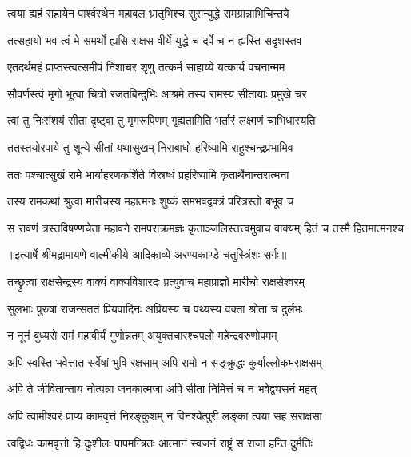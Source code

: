 \twolineshloka
{त्वया ह्यहं सहायेन पार्श्वस्थेन महाबल}
{भ्रातृभिश्च सुरान्युद्धे समग्रान्नाभिचिन्तये} %

\twolineshloka
{तत्सहायो भव त्वं मे समर्थो ह्यसि राक्षस}
{वीर्ये युद्धे च दर्पे च न ह्यस्ति सदृशस्तव} %

\twolineshloka
{एतदर्थमहं प्राप्तस्त्वत्समीपं निशाचर}
{शृणु तत्कर्म साहाय्ये यत्कार्यं वचनान्मम} %

\twolineshloka
{सौवर्णस्त्वं मृगो भूत्वा चित्रो रजतबिन्दुभिः}
{आश्रमे तस्य रामस्य सीतायाः प्रमुखे चर} %

\twolineshloka
{त्वां तु निःसंशयं सीता दृष्ट्वा तु मृगरूपिणम्}
{गृह्यतामिति भर्तारं लक्ष्मणं चाभिधास्यति} %

\twolineshloka
{ततस्तयोरपाये तु शून्ये सीतां यथासुखम्}
{निराबाधो हरिष्यामि राहुश्चन्द्रप्रभामिव} %

\twolineshloka
{ततः पश्चात्सुखं रामे भार्याहरणकर्शिते}
{विस्रब्धं प्रहरिष्यामि कृतार्थेनान्तरात्मना} %

\twolineshloka
{तस्य रामकथां श्रुत्वा मारीचस्य महात्मनः}
{शुष्कं समभवद्वक्त्रं परित्रस्तो बभूव च} %

\fourlineindentedshloka
{स रावणं त्रस्तविषण्णचेता}
{महावने रामपराक्रमज्ञः}
{कृताञ्जलिस्तत्त्वमुवाच वाक्यम्}
{हितं च तस्मै हितमात्मनश्च} %


{॥इत्यार्षे श्रीमद्रामायणे वाल्मीकीये आदिकाव्ये अरण्यकाण्डे चतुस्त्रिंशः सर्गः॥}


\twolineshloka
{तच्छ्रुत्वा राक्षसेन्द्रस्य वाक्यं वाक्यविशारदः}
{प्रत्युवाच महाप्राज्ञो मारीचो राक्षसेश्वरम्} %

\twolineshloka
{सुलभाः पुरुषा राजन्सततं प्रियवादिनः}
{अप्रियस्य च पथ्यस्य वक्ता श्रोता च दुर्लभः} %

\twolineshloka
{न नूनं बुध्यसे रामं महावीर्यं गुणोन्नतम्}
{अयुक्तचारश्चपलो महेन्द्रवरुणोपमम्} %

\twolineshloka
{अपि स्वस्ति भवेत्तात सर्वेषां भुवि रक्षसाम्}
{अपि रामो न सङ्क्रुद्धः कुर्याल्लोकमराक्षसम्} %

\twolineshloka
{अपि ते जीवितान्ताय नोत्पन्ना जनकात्मजा}
{अपि सीता निमित्तं च न भवेद्व्यसनं महत्} %

\twolineshloka
{अपि त्वामीश्वरं प्राप्य कामवृत्तं निरङ्कुशम्}
{न विनश्येत्पुरी लङ्का त्वया सह सराक्षसा} %

\twolineshloka
{त्वद्विधः कामवृत्तो हि दुःशीलः पापमन्त्रितः}
{आत्मानं स्वजनं राष्ट्रं स राजा हन्ति दुर्मतिः} %

